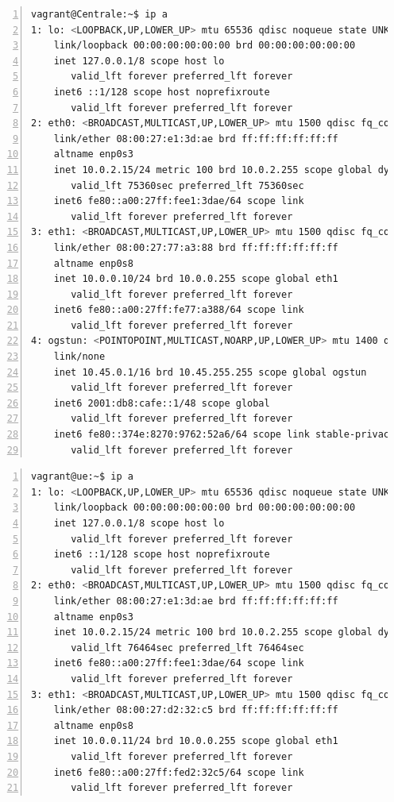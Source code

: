 \begin{lstlisting}[basicstyle=\small, frame=single, breaklines=true, postbreak=\mbox{\textcolor{red}{$\hookrightarrow$}\space}, escapeinside ={\%,}, escapechar={!}, numbers=left, language=sh, caption=IP configuratie Centrale]
vagrant@Centrale:~$ ip a
1: lo: <LOOPBACK,UP,LOWER_UP> mtu 65536 qdisc noqueue state UNKNOWN group default qlen 1000
    link/loopback 00:00:00:00:00:00 brd 00:00:00:00:00:00
    inet 127.0.0.1/8 scope host lo
       valid_lft forever preferred_lft forever
    inet6 ::1/128 scope host noprefixroute
       valid_lft forever preferred_lft forever
2: eth0: <BROADCAST,MULTICAST,UP,LOWER_UP> mtu 1500 qdisc fq_codel state UP group default qlen 1000
    link/ether 08:00:27:e1:3d:ae brd ff:ff:ff:ff:ff:ff
    altname enp0s3
    inet 10.0.2.15/24 metric 100 brd 10.0.2.255 scope global dynamic eth0
       valid_lft 75360sec preferred_lft 75360sec
    inet6 fe80::a00:27ff:fee1:3dae/64 scope link
       valid_lft forever preferred_lft forever
3: eth1: <BROADCAST,MULTICAST,UP,LOWER_UP> mtu 1500 qdisc fq_codel state UP group default qlen 1000
    link/ether 08:00:27:77:a3:88 brd ff:ff:ff:ff:ff:ff
    altname enp0s8
    inet 10.0.0.10/24 brd 10.0.0.255 scope global eth1
       valid_lft forever preferred_lft forever
    inet6 fe80::a00:27ff:fe77:a388/64 scope link
       valid_lft forever preferred_lft forever
4: ogstun: <POINTOPOINT,MULTICAST,NOARP,UP,LOWER_UP> mtu 1400 qdisc fq_codel state UP group default qlen 500
    link/none
    inet 10.45.0.1/16 brd 10.45.255.255 scope global ogstun
       valid_lft forever preferred_lft forever
    inet6 2001:db8:cafe::1/48 scope global
       valid_lft forever preferred_lft forever
    inet6 fe80::374e:8270:9762:52a6/64 scope link stable-privacy
       valid_lft forever preferred_lft forever
\end{lstlisting}

\begin{lstlisting}[basicstyle=\small, frame=single, breaklines=true, postbreak=\mbox{\textcolor{red}{$\hookrightarrow$}\space}, escapeinside ={\%,}, escapechar={!}, numbers=left, language=sh, caption=IP configuratie Member]
vagrant@ue:~$ ip a
1: lo: <LOOPBACK,UP,LOWER_UP> mtu 65536 qdisc noqueue state UNKNOWN group default qlen 1000
    link/loopback 00:00:00:00:00:00 brd 00:00:00:00:00:00
    inet 127.0.0.1/8 scope host lo
       valid_lft forever preferred_lft forever
    inet6 ::1/128 scope host noprefixroute
       valid_lft forever preferred_lft forever
2: eth0: <BROADCAST,MULTICAST,UP,LOWER_UP> mtu 1500 qdisc fq_codel state UP group default qlen 1000
    link/ether 08:00:27:e1:3d:ae brd ff:ff:ff:ff:ff:ff
    altname enp0s3
    inet 10.0.2.15/24 metric 100 brd 10.0.2.255 scope global dynamic eth0
       valid_lft 76464sec preferred_lft 76464sec
    inet6 fe80::a00:27ff:fee1:3dae/64 scope link
       valid_lft forever preferred_lft forever
3: eth1: <BROADCAST,MULTICAST,UP,LOWER_UP> mtu 1500 qdisc fq_codel state UP group default qlen 1000
    link/ether 08:00:27:d2:32:c5 brd ff:ff:ff:ff:ff:ff
    altname enp0s8
    inet 10.0.0.11/24 brd 10.0.0.255 scope global eth1
       valid_lft forever preferred_lft forever
    inet6 fe80::a00:27ff:fed2:32c5/64 scope link
       valid_lft forever preferred_lft forever
\end{lstlisting}

